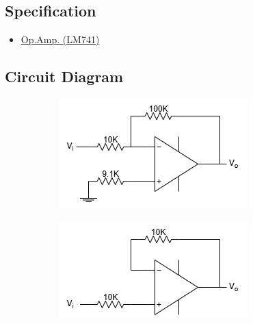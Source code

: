     \subsection{Specification}
        \begin{itemize}
            \item \hyperref[LM741_1]{Op.Amp. (LM741)}
        \end{itemize}
        
    \subsection{Circuit Diagram}
    \begin{figure}[h]

        \begin{subfigure}[h]{0.47\textwidth}
        \begin{center}
            \includegraphics[width=1\linewidth]{Lab10/Lab10a.drawio.png}
            \caption{}
            \label{L10a}
        \end{center} 
        \end{subfigure}
    \hfill
    \vspace{0.2 cm}
        \begin{subfigure}[h]{0.47\textwidth}
        \begin{center}
            \includegraphics[width=1\linewidth]{Lab10/Lab10b.drawio.png}
            \caption{}
            \label{L10b}
        \end{center}
        \end{subfigure}
    \vfill
    

\end{figure}
